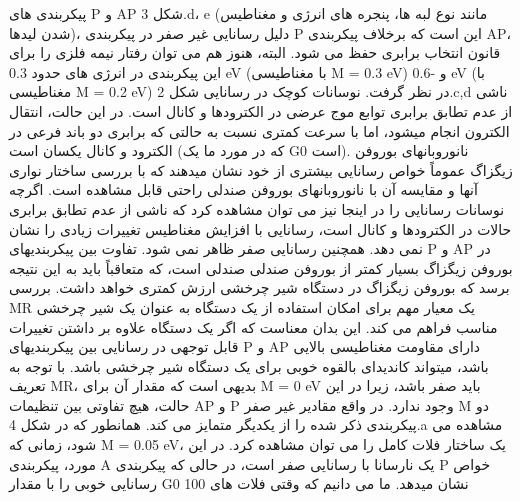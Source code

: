 پیکربندی های P و AP شکل 3.d، e (مانند نوع لبه ها، پنجره های انرژی و مغناطیس شدن لیدها)، دلیل رسانایی غیر صفر در پیکربندی P این است که برخلاف پیکربندی AP، قانون انتخاب برابری حفظ می شود. البته، هنوز هم می توان رفتار نیمه فلزی را برای این پیکربندی در انرژی های حدود 0.3 eV (با مغناطیسی M = 0.3 eV) و -0.6 eV (با مغناطیسی M = 0.2 eV) در نظر گرفت. نوسانات کوچک در رسانایی شکل 2.c,d ناشی از عدم تطابق برابری توابع موج عرضی در الکترودها و کانال است. در این حالت، انتقال الکترون انجام میشود، اما با سرعت کمتری نسبت به حالتی که برابری دو باند فرعی در الکترود و کانال یکسان است (که در مورد ما یک G0 است). نانوروبانهای بوروفن زیگزاگ عموماً خواص رسانایی بیشتری از خود نشان میدهند که با بررسی ساختار نواری آنها و مقایسه آن با نانوروبانهای بوروفن صندلی راحتی قابل مشاهده است. اگرچه نوسانات رسانایی را در اینجا نیز می توان مشاهده کرد که ناشی از عدم تطابق برابری حالات در الکترودها و کانال است، رسانایی با افزایش مغناطیس تغییرات زیادی را نشان نمی دهد. همچنین رسانایی صفر ظاهر نمی شود. تفاوت بین پیکربندیهای P و AP در بوروفن زیگزاگ بسیار کمتر از بوروفن صندلی صندلی است، که متعاقباً باید به این نتیجه برسد که بوروفن زیگزاگ در دستگاه شیر چرخشی ارزش کمتری خواهد داشت. بررسی MR یک معیار مهم برای امکان استفاده از یک دستگاه به عنوان یک شیر چرخشی مناسب فراهم می کند. این بدان معناست که اگر یک دستگاه علاوه بر داشتن تغییرات قابل توجهی در رسانایی بین پیکربندیهای P و AP دارای مقاومت مغناطیسی بالایی باشد، میتواند کاندیدای بالقوه خوبی برای یک دستگاه شیر چرخشی باشد. با توجه به تعریف MR، بدیهی است که مقدار آن برای M = 0 eV باید صفر باشد، زیرا در این حالت، هیچ تفاوتی بین تنظیمات AP و P وجود ندارد. در واقع مقادیر غیر صفر M دو پیکربندی ذکر شده را از یکدیگر متمایز می کند. همانطور که در شکل 4.a مشاهده می شود، زمانی که M = 0.05 eV، یک ساختار فلات کامل را می توان مشاهده کرد. در این مورد، پیکربندی A یک نارسانا با رسانایی صفر است، در حالی که پیکربندی P خواص رسانایی خوبی را با مقدار G0 نشان میدهد. ما می دانیم که وقتی فلات های 100%
